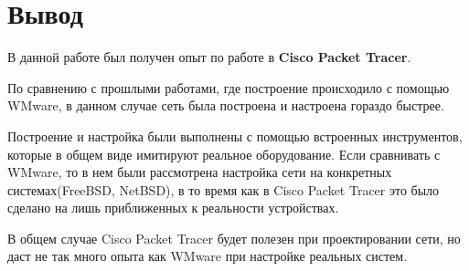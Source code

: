 \documentclass[a4paper, 12pt]{article}		%
\begin{document}


\section*{Вывод}
В данной работе был получен опыт по работе в \textbf{Cisco Packet Tracer}.

По сравнению с прошлыми работами, где построение происходило с помощью WMware, в данном случае сеть была построена и настроена гораздо быстрее.

Построение и настройка были выполнены с помощью встроенных инструментов, которые в общем виде имитируют реальное оборудование. Если сравнивать с WMware, то в нем были рассмотрена настройка сети на конкретных системах(FreeBSD, NetBSD), в то время как в Cisco Packet Tracer это было сделано на лишь приближенных к реальности устройствах.

В общем случае Cisco Packet Tracer будет полезен при проектировании сети, но даст не так много опыта как WMware при настройке реальных систем.

%
%
\end{document}
